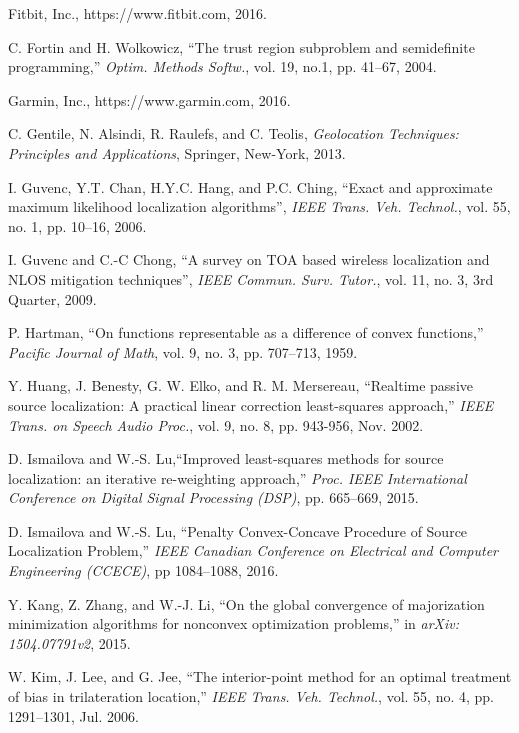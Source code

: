 \begin{thebibliography}{99}
Fitbit, Inc.,  https://www.fitbit.com, 2016.

 \label{r15}
C. Fortin and H. Wolkowicz, ``The trust region subproblem and semidefinite programming,'' {\em Optim. Methods Softw.}, vol. 19, no.1, pp. 41--67, 2004.


Garmin, Inc.,  https://www.garmin.com, 2016.

C. Gentile, N. Alsindi, R. Raulefs, and C. Teolis, {\em Geolocation Techniques: Principles and Applications}, Springer, New-York, 2013.

I. Guvenc, Y.T. Chan, H.Y.C. Hang, and P.C. Ching, ``Exact and approximate maximum likelihood localization algorithms'', {\em IEEE Trans. Veh. Technol.}, vol. 55, no. 1, pp. 10--16, 2006.

I. Guvenc and C.-C Chong, ``A survey on TOA based wireless localization and NLOS mitigation techniques'', {\em IEEE Commun. Surv. Tutor.}, vol. 11, no. 3, 3rd Quarter, 2009.


P. Hartman, ``On functions representable as a difference of convex functions,'' {\em Pacific Journal of Math}, vol. 9, no. 3, pp. 707--713, 1959.


 \label{3}
Y. Huang, J. Benesty, G. W. Elko, and R. M. Mersereau, ``Realtime passive source localization: A practical linear correction least-squares approach,'' {\em IEEE Trans. on Speech Audio Proc.}, vol. 9, no. 8, pp. 943-956, Nov. 2002.


D. Ismailova and W.-S. Lu,``Improved least-squares methods for source localization: an iterative re-weighting approach,'' {\em Proc.  IEEE International Conference on Digital Signal Processing (DSP)}, pp. 665--669, 2015.

D. Ismailova and W.-S. Lu, ``Penalty Convex-Concave Procedure of Source Localization Problem,'' {\em IEEE Canadian Conference on Electrical and Computer Engineering (CCECE)}, pp 1084--1088, 2016.


Y. Kang, Z. Zhang, and W.-J. Li, ``On the global convergence of majorization minimization algorithms for nonconvex optimization problems,'' in {\em arXiv: 1504.07791v2}, 2015.

W. Kim, J. Lee, and G. Jee, ``The interior-point method for an optimal treatment of bias in trilateration location,'' {\em IEEE Trans. Veh. Technol.}, vol. 55, no. 4, pp. 1291--1301, Jul. 2006.


\end{thebibliography}
